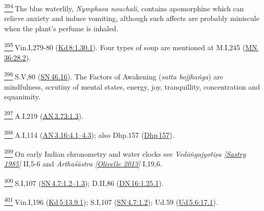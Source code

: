 \label{footprints_split_024.html_fn394}
\hyperref[footprints_split_011.htmlux5cux23fnref394]{\textsuperscript{394}} The
blue waterlily, \emph{Nymphaea nouchali}, contains apomorphine which can
relieve anxiety and induce vomiting, although such affects are probably
miniscule when the plant's perfume is inhaled.

\label{footprints_split_024.html_fn395}
\hyperref[footprints_split_011.htmlux5cux23fnref395]{\textsuperscript{395}} Vin.I,279-80
(\href{https://suttacentral.net/pli-tv-kd8/en/brahmali?\#1.30.1}{Kd\,8:1.30.1}).
Four types of soup are mentioned at M.I,245
(\href{https://suttacentral.net/mn36/en/sujato\#28.2}{MN\,36:28.2}).

\label{footprints_split_024.html_fn396}
\hyperref[footprints_split_011.htmlux5cux23fnref396]{\textsuperscript{396}} S.V,80
(\href{https://suttacentral.net/sn46.16/en/sujato}{SN\,46.16}). The
Factors of Awakening (\emph{satta bojjhaṅga}) are mindfulness, scrutiny
of mental states, energy, joy, tranquillity, concentration and
equanimity.

\label{footprints_split_024.html_fn397}
\hyperref[footprints_split_011.htmlux5cux23fnref397]{\textsuperscript{397}} A.I,219
(\href{https://suttacentral.net/an3.73/en/sujato\#1.3}{AN\,3.73:1.3}).

\label{footprints_split_024.html_fn398}
\hyperref[footprints_split_011.htmlux5cux23fnref398]{\textsuperscript{398}} A.I,114
(\href{https://suttacentral.net/an3.16/en/sujato\#4.1}{AN\,3.16:4.1--4.3});
also Dhp.157
(\href{https://suttacentral.net/dhp157/en/sujato}{Dhp\,157}).

\label{footprints_split_024.html_fn399}
\hyperref[footprints_split_011.htmlux5cux23fnref399]{\textsuperscript{399}} On
early Indian chronometry and water clocks see \emph{{Vedāṅgajyotiṣa
{{[}\hyperref[footprints_split_023.htmlux5cux23Sastryux5cux25201985]{Sastry
1985}{]}}}} II,5-6 and \emph{{Arthaśāstra
{{[}\hyperref[footprints_split_022.htmlux5cux23Olivelleux5cux25202013]{Olivelle
2013}{]}}}} I,19,6.

\label{footprints_split_024.html_fn400}
\hyperref[footprints_split_011.htmlux5cux23fnref400]{\textsuperscript{400}} S.I,107
(\href{https://suttacentral.net/sn4.7/en/sujato\#1.2}{SN\,4.7:1.2--1.3});
D.II,86
(\href{https://suttacentral.net/dn16/en/sujato\#1.25.1}{DN\,16:1.25.1}).

\label{footprints_split_024.html_fn401}
\hyperref[footprints_split_011.htmlux5cux23fnref401]{\textsuperscript{401}} Vin.I,196
(\href{https://suttacentral.net/pli-tv-kd5/en/brahmali?\#13.9.1}{Kd\,5:13.9.1});
S.I,107
(\href{https://suttacentral.net/sn4.7/en/sujato\#1.2}{SN\,4.7:1.2});
Ud.59
(\href{https://suttacentral.net/ud5.6/en/sujato\#17.1}{Ud\,5.6:17.1}).

